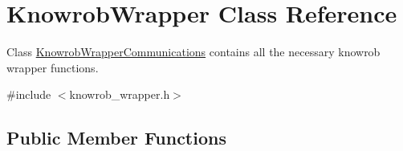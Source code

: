 \hypertarget{classKnowrobWrapper}{\section{Knowrob\-Wrapper Class Reference}
\label{classKnowrobWrapper}
}


Class \hyperlink{classKnowrobWrapperCommunications}{Knowrob\-Wrapper\-Communications} contains all the necessary knowrob wrapper functions.  




{\ttfamily \#include $<$knowrob\-\_\-wrapper.\-h$>$}

\subsection*{Public Member Functions}
